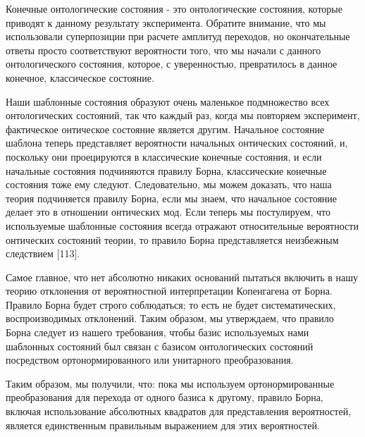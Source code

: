 \documentclass[main.tex]{subfiles}
\begin{document}
Конечные онтологические состояния - это онтологические состояния, которые приводят к данному результату эксперимента. Обратите внимание, что мы использовали суперпозиции при расчете амплитуд переходов, но окончательные ответы просто соответствуют вероятности того, что мы начали с данного онтологического состояния, которое, с уверенностью, превратилось в данное конечное, классическое состояние.

Наши шаблонные состояния образуют очень маленькое подмножество всех онтологических состояний, так что каждый раз, когда мы повторяем эксперимент, фактическое онтическое состояние является другим. Начальное состояние шаблона теперь представляет вероятности начальных онтических состояний, и, поскольку они проецируются в классические конечные состояния, и если начальные состояния подчиняются правилу Борна, классические конечные состояния тоже ему следуют. Следовательно, мы можем доказать, что наша теория подчиняется правилу Борна, если мы знаем, что начальное состояние делает это в отношении онтических мод. Если теперь мы постулируем, что используемые шаблонные состояния всегда отражают относительные вероятности онтических состояний теории, то правило Борна представляется неизбежным следствием [113].

Самое главное, что нет абсолютно никаких оснований пытаться включить в нашу теорию отклонения от вероятностной интерпретации Копенгагена от Борна. Правило Борна будет строго соблюдаться; то есть не будет систематических, воспроизводимых отклонений. Таким образом, мы утверждаем, что правило Борна следует из нашего требования, чтобы базис используемых нами шаблонных состояний был связан с базисом онтологических состояний посредством ортонормированного или унитарного преобразования.

Таким образом, мы получили, что: пока мы используем ортонормированные преобразования для перехода от одного базиса к другому, правило Борна, включая использование абсолютных квадратов для представления вероятностей, является единственным правильным выражением для этих вероятностей.
\end{document}
